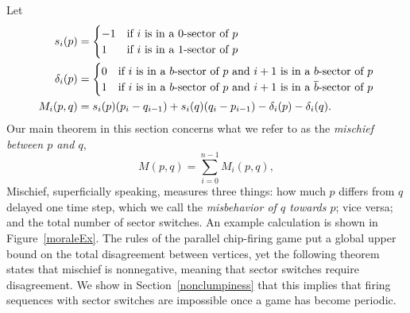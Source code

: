 Let
\begin{align*}
  s_i(p) &= \begin{cases}
    -1 & \text{if $i$ is in a 0-sector of $p$} \\
    1 & \text{if $i$ is in a 1-sector of $p$}
  \end{cases} \\
  \delta_i(p) &= \begin{cases}
    0 & \text{if $i$ is in a $b$-sector of $p$ and $i+1$ is in a $b$-sector of
      $p$} \\
    1 & \text{if $i$ is in a $b$-sector of $p$ and $i+1$ is in a
      $\overline{b}$-sector of $p$}
  \end{cases} \\
  M_i(p,q) &= s_i(p)(p_i - q_{i-1}) + s_i(q)(q_i - p_{i-1}) - \delta_i(p) -
  \delta_i(q).
\end{align*}
Our main theorem in this section concerns what we refer to as the
\emph{mischief between $p$ and $q$},
\[
  M(p,q) = \sum_{i=0}^{n-1} M_i(p,q),
\]
Mischief, superficially speaking, measures three things: how much $p$ differs
from $q$ delayed one time step, which we call the \emph{misbehavior of $q$
  towards $p$}; vice versa; and the total number of sector switches. An example
calculation is shown in Figure~\ref{moraleEx}. The rules of the parallel
chip-firing game put a global upper bound on the total disagreement between
vertices, yet the following theorem states that mischief is nonnegative,
meaning that sector switches require disagreement. We show in
Section~\ref{nonclumpiness} that this implies that firing sequences with sector
switches are impossible once a game has become periodic.


